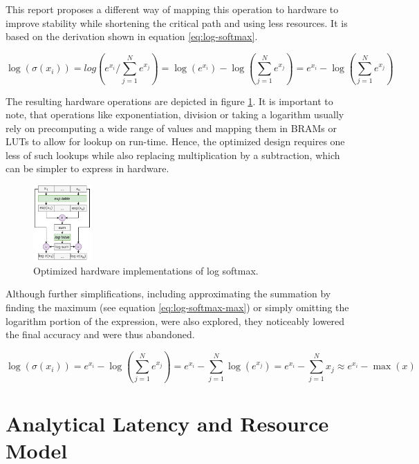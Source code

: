This report proposes a different way of mapping this operation to hardware to improve stability while shortening the critical path and using less resources. It is based on the derivation shown in equation \ref{eq:log-softmax}.

\begin{equation} \label{eq:log-softmax}
    \log (\sigma (x_i)) = log(e^{x_i} / \sum_{j=1}^{N} e^{x_j}) = \log(e^{x_i}) - \log(\sum_{j=1}^{N} e^{x_j}) = e^{x_i} - \log(\sum_{j=1}^{N} e^{x_j})
\end{equation}

The resulting hardware operations are depicted in figure \ref{fig:log-softmax-opt}. It is important to note, that operations like exponentiation, division or taking a logarithm usually rely on precomputing a wide range of values and mapping them in BRAMs or LUTs to allow for lookup on run-time. Hence, the optimized design requires one less of such lookups while also replacing multiplication by a subtraction, which can be simpler to express in hardware.

\begin{figure}[hpt!]
  \centering
  \includegraphics[trim={0cm 0cm 0cm 0cm}, width=0.2\textwidth, center]{models/log_softmax_opt.pdf}
  \caption{Optimized hardware implementations of log softmax.}
  \label{fig:log-softmax-opt}
\end{figure}

Although further simplifications, including approximating the summation by finding the maximum (see equation \ref{eq:log-softmax-max}) or simply omitting the logarithm portion of the expression, were also explored, they noticeably lowered the final accuracy and were thus abandoned.

\begin{equation} \label{eq:log-softmax-max}
    \log (\sigma (x_i)) = e^{x_i} - \log(\sum_{j=1}^{N} e^{x_j}) = e^{x_i} - \sum_{j=1}^{N} \log(e^{x_j}) = e^{x_i} - \sum_{j=1}^{N} x_j \approx e^{x_i} - \max(x)
\end{equation}


\section{Analytical Latency and Resource Model}
\indo{|}
\indo{|}
\indo{|}
\indo{|}
\indo{|}
\indo{|}
\indo{|}
\indo{|}
\indo{|}
\indo{|}


